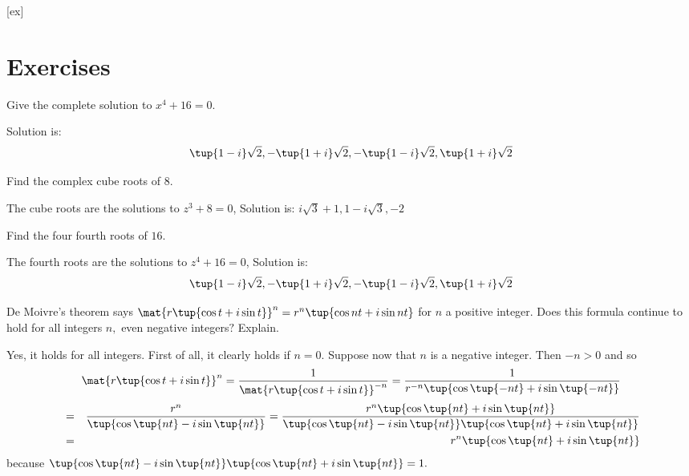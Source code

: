 [ex]
\section*{Exercises}

\begin{enumialphparenastyle}

\begin{ex} Give the complete solution to $x^{4}+16=0.$ 
\begin{sol}
 Solution is:
\[
\tup{1-i} \sqrt{2},-\tup{1+i} \sqrt{2},-\tup{1-i}
\sqrt{2},\tup{1+i} \sqrt{2}
\]
\end{sol}
\end{ex}

\begin{ex} \label{cube-roots} Find the complex cube roots of $8$.
\begin{sol}
The cube roots are the solutions to $%
z^{3}+8=0$, Solution is: $i\sqrt{3} +1,1-i\sqrt{3},-2$
\end{sol}
\end{ex}

\begin{ex} \label{cube-roots2} Find the four fourth roots of $16$.  
\begin{sol}
The fourth roots are
the solutions to $z^{4}+16=0$, Solution is:
\[
\tup{1-i} \sqrt{2},-\tup{1+i} \sqrt{2},-\tup{1-i}
\sqrt{2},\tup{1+i}\sqrt{2}
\]
\end{sol}
\end{ex}

\begin{ex} \label{exer-complex1}De Moivre's theorem says $\mat{r\tup{\cos
t+i\sin t}} ^{n}=r^{n}\tup{\cos nt+i\sin nt} $ for $n$
a positive integer. Does this formula continue to hold for all integers $n,$
even negative integers$?$ Explain.  
\begin{sol}
Yes, it holds for all integers. First of
all, it clearly holds if $n=0$. Suppose now that $n$ is a negative integer.
Then $-n>0$ and so
\[
\mat{r\tup{\cos t+i\sin t}} ^{n}=\frac{1}{\mat{r\tup{
\cos t+i\sin t}} ^{-n}}=\frac{1}{r^{-n}\tup{\cos \tup{
-nt} +i\sin \tup{-nt} } }
\]
\begin{eqnarray*}
&=&\frac{r^{n}}{\tup{\cos \tup{nt} -i\sin \tup{nt} }
}=\frac{r^{n}\tup{\cos \tup{nt} +i\sin \tup{nt} } }{
\tup{\cos \tup{nt} -i\sin \tup{nt} } \tup{\cos
\tup{nt} +i\sin \tup{nt} } } \\
&=&r^{n}\tup{\cos \tup{nt} +i\sin \tup{nt} }
\end{eqnarray*}
because $\tup{\cos \tup{nt} -i\sin \tup{nt} } \tup{
\cos \tup{nt} +i\sin \tup{nt} } =1.$
\end{sol}
\end{ex}


\end{enumialphparenastyle}
